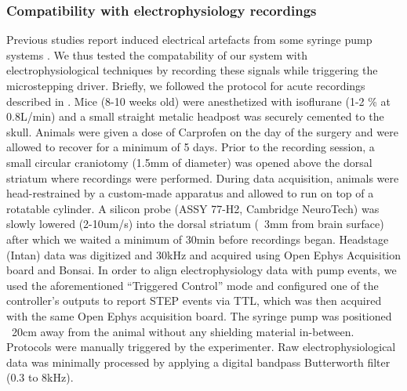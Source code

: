 \subsubsection*{Compatibility with electrophysiology recordings}

Previous studies report induced electrical artefacts from some syringe pump systems . We thus tested the compatability of our system with electrophysiological techniques by recording these signals while triggering the microstepping driver. 
Briefly, we followed the protocol for acute recordings described in \cite{Cruz2022}. Mice (8-10 weeks old) were anesthetized with isoflurane (1-2 \% at 0.8L/min) and a small straight metalic headpost was securely cemented to the skull. Animals were given a dose of Carprofen on the day of the surgery and were allowed to recover for a minimum of 5 days. Prior to the recording session, a small circular craniotomy (1.5mm of diameter) was opened above the dorsal striatum where recordings were performed. During data acquisition, animals were head-restrained by a custom-made apparatus and allowed to run on top of a rotatable cylinder. A silicon probe (ASSY 77-H2, Cambridge NeuroTech) was slowly lowered (2-10um/s) into the dorsal striatum (~3mm from brain surface) after which we waited a minimum of 30min before recordings began. Headstage (Intan) data was digitized and 30kHz and acquired using Open Ephys Acquisition board and Bonsai. In order to align electrophysiology data with pump events, we used the aforementioned “Triggered Control” mode and configured one of the controller’s outputs to report STEP events via TTL, which was then acquired with the same Open Ephys acquisition board. The syringe pump was positioned ~20cm away from the animal without any shielding material in-between. Protocols were manually triggered by the experimenter.
Raw electrophysiological data was minimally processed by applying a digital bandpass Butterworth filter (0.3 to 8kHz).


